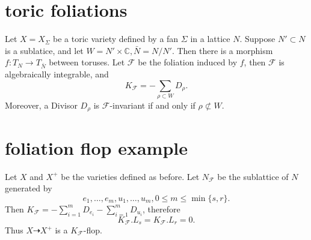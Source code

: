 \documentclass{article}
\begin{document}
\section{toric foliations}
Let $X=X_{\Sigma}$ be a toric variety defined by a fan $\Sigma$ in a lattice $N$. Suppose $N' \subset N$ is a sublatice, and let $W=N' \times \mathbb{C},\bar{N}=N/N'$. Then there is a morphism $f:T_{N} \to T_{\bar{N}}$ between toruses. Let $\mathcal{F}$ be the foliation induced by $f$, then $\mathcal{F}$ is algebraically integrable, and 
\[
  K_{\mathcal{F}}=-\sum_{\rho \subset W}D_{\rho}.
\]
Moreover, a Divisor $D_{\rho}$ is $\mathcal{F}$-invariant   if and only if $\rho \not\subset W$.

\section{foliation flop example}
Let $X$ and $X^{+}$ be the varieties defined as before. Let $N_{\mathcal{F}}$ be the sublattice of $N$ generated by
\[
  e_{1},\ldots ,e_{m},u_{1},\ldots ,u_{m},0\leqslant m \leqslant \min \{s,r\}.
\]
Then $K_{\mathcal{F}}=-\sum_{i=1}^{m}D_{e_{i}}-\sum_{i=1}^{m}D_{u_{i}}$, therefore
\[
  K_{\mathcal{F}}.L_{s}=K_{\mathcal{F}}.L_{r}=0.
\]
Thus $X\dashrightarrow X^{+}$ is a $K_{\mathcal{F}}$-flop.
\end{document}
